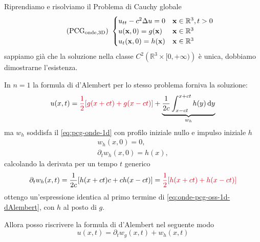 \documentclass[10pt,a4paper,twoside,openright]{book}
\newcommand{\x}{\mathbf{x}}
\newcommand{\de}{\,\mathrm d}
\newcommand{\dy}{\de y}
\begin{document}
Riprendiamo e risolviamo il Problema di Cauchy globale
\begin{equation*}
	\tag{PCG$_{\text{onde,3D}}$} \ 
	\begin{cases}
		u_{tt} -c^{2} \Delta u=0            & \x \in \mathbb{R}^{3} ,t >0 \\
		u(\x ,0) =g(\x)     & \x\in\mathbb{R}^{3}        \\
		u_{t}(\x ,0) =h(\x) & \x\in\mathbb{R}^{3}        
	\end{cases}
\end{equation*}
sappiamo già che la soluzione nella classe $C^{2}\left(\mathbb{R}^{3} \times [ 0,+\infty)\right)$ è unica, dobbiamo dimostrarne l'esistenza.
\begin{oss}
	In $n=1$ la formula di d'Alembert per lo stesso problema forniva la soluzione:
	\begin{equation}
		u(x,t) =\textcolor[rgb]{0.82,0.01,0.11}{\frac{1}{2}[g(x+ct)+g(x-ct)]} +\underbrace{\frac{1}{2c}\int _{x-ct}^{x+ct} h(y) \dy}_{w_{h}}
		\label{eq:onde-pcg-oss-1d-dAlembert}
	\end{equation}
	ma $\displaystyle w_{h}$ soddisfa il \eqref{eq:pcg-onde-1d} con profilo iniziale nullo e impulso iniziale $h$
	\begin{gather*}
		w_{h}(x,0) =0,\\
		\partial _{t} w_{h}(x,0) =h(x) ,
	\end{gather*}
	calcolando la derivata per un tempo $t$ generico
	\begin{equation*}
		\partial _{t} w_{h}(x,t) =\frac{1}{2c}[ h(x+ct) c+ch(x-ct)] =\textcolor[rgb]{0.82,0.01,0.11}{\frac{1}{2}[h(x+ct)+h(x-ct)]}
	\end{equation*}
	ottengo un'espressione identica al primo termine di \eqref{eq:onde-pcg-oss-1d-dAlembert}, con $h$ al posto di $g$.
	
	Allora posso riscrivere la formula di d'Alembert nel seguente modo
	\begin{equation*}
		u(x,t) =\partial _{t} w_{g}(x,t) +w_{h}(x,t)
	\end{equation*}
\end{oss}
\end{document}
